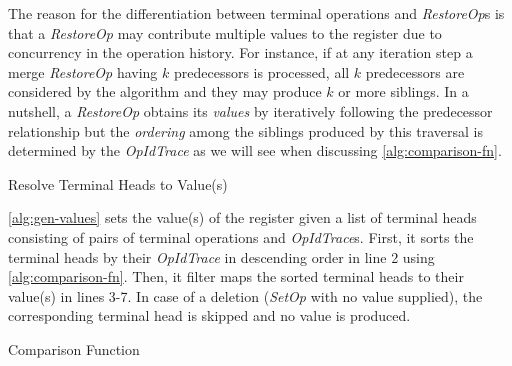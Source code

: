 \documentclass[sigplan,natbib=false,review]{acmart}
\newcommand{\setopkind}{\textit{SetOp}}
\newcommand{\restopkind}{\textit{RestoreOp}}
\newcommand{\opidtrace}{\textit{OpIdTrace}}
\begin{document}
The reason for the differentiation between terminal operations and
\restopkind{}s is that a \restopkind{} may contribute multiple values to
the register due to concurrency in the operation history.
For instance, if at any iteration step a merge \restopkind{} having $k$
predecessors is processed, all $k$ predecessors are considered by the algorithm
and they may produce $k$ or more siblings.
In a nutshell, a \restopkind{} obtains its \emph{values} by iteratively
following the predecessor relationship but the \emph{ordering} among the siblings
produced by this traversal is determined by the \opidtrace{} as we will
see when discussing \autoref{alg:comparison-fn}.

\begin{algorithm}
  \caption{Resolve Terminal Heads to Value(s)}\label{alg:gen-values}
  \begin{algorithmic}[1]
          \EndIf{}
        \EndFor{}
    \EndFunction{}
  \end{algorithmic}
\end{algorithm}

\autoref{alg:gen-values} sets the value(s) of the register
given a list of terminal heads consisting of pairs of terminal operations and
\opidtrace{}s.
First, it sorts the terminal heads by their \opidtrace{}
in descending order in line 2 using \cref{alg:comparison-fn}.
Then, it filter maps the sorted terminal heads to their value(s) in lines 3-7.
In case of a deletion (\setopkind{} with no value supplied),
the corresponding terminal head is skipped and no value is produced.

\begin{algorithm}
  \caption{Comparison Function}\label{alg:comparison-fn}
  \begin{algorithmic}[1]
        \EndIf{}
      \EndFor{}
    \EndFunction{}
  \end{algorithmic}
\end{algorithm}
\end{document}
